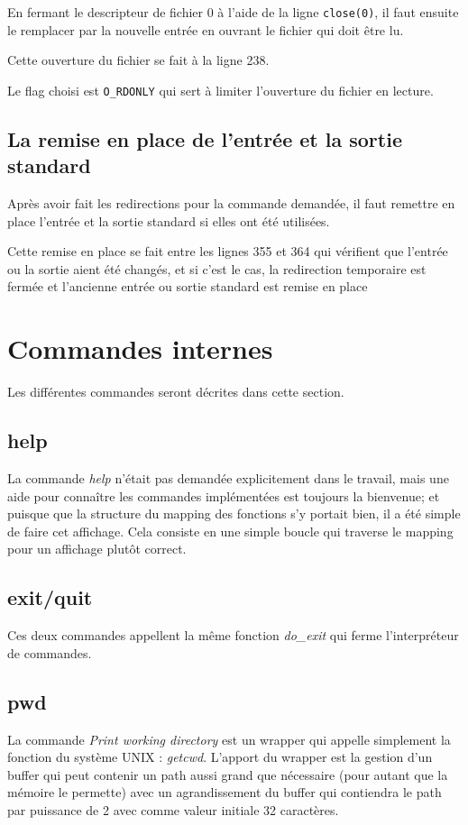 \documentclass[a4paper,10pt]{article}
\begin{document}
En fermant le descripteur de fichier 0 à l'aide de la ligne \verb?close(0)?, il faut ensuite le remplacer par la nouvelle entrée en ouvrant le fichier qui doit être lu.

Cette ouverture du fichier se fait à la ligne 238.

Le flag choisi est \verb?O_RDONLY? qui sert à limiter l'ouverture du fichier en lecture.

\subsection{La remise en place de l'entrée et la sortie standard}
Après avoir fait les redirections pour la commande demandée, il faut remettre en place l'entrée et la sortie standard si elles ont été utilisées.

Cette remise en place se fait entre les lignes 355 et 364 qui vérifient que l'entrée ou la sortie aient été changés, et si c'est le cas, la redirection temporaire est fermée et l'ancienne entrée ou sortie standard est remise en place

\section{Commandes internes}
Les différentes commandes seront décrites dans cette section.
\subsection{help}
La commande \emph{help} n'était pas demandée explicitement dans le travail, mais une aide pour connaître les commandes implémentées est toujours la bienvenue; et puisque que la structure du mapping des fonctions s'y portait bien, il a été simple de faire cet affichage. Cela consiste en une simple boucle qui traverse le mapping pour un affichage plutôt correct.
\subsection{exit/quit}
Ces deux commandes appellent la même fonction \emph{do\_exit} qui ferme l'interpréteur de commandes.
\subsection{pwd}
La commande \emph{Print working directory} est un wrapper qui appelle simplement la fonction du système UNIX : \emph{getcwd}. L'apport du wrapper est la gestion d'un buffer qui peut contenir un path aussi grand que nécessaire (pour autant que la mémoire le permette) avec un agrandissement du buffer qui contiendra le path par puissance de 2 avec comme valeur initiale 32 caractères.
\end{document}
